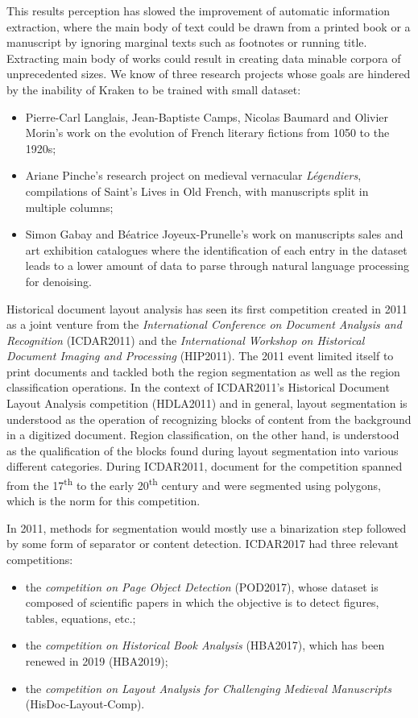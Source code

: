\documentclass{jdmdh}
\begin{document}
This results perception has slowed the improvement of automatic information extraction, where the main body of text could be drawn from a printed book or a manuscript by ignoring marginal texts such as footnotes or running title. Extracting main body of works could result in creating data minable corpora of unprecedented sizes. We know of three research projects whose goals are hindered by the inability of Kraken to be trained with small dataset:

\begin{itemize}
    \item Pierre-Carl Langlais, Jean-Baptiste Camps, Nicolas Baumard and Olivier Morin's work on the evolution of French literary fictions from 1050 to the 1920s;
    \item Ariane Pinche's research project on medieval vernacular \textit{Légendiers}, compilations of Saint's Lives in Old French, with manuscripts split in multiple columns;
    \item Simon Gabay and Béatrice Joyeux-Prunelle's work on manuscripts sales and art exhibition catalogues where the identification of each entry in the dataset leads to a lower amount of data to parse through natural language processing for denoising.
\end{itemize}

Historical document layout analysis has seen its first competition created in 2011 as a joint venture from the \textit{International Conference on Document Analysis and Recognition} (ICDAR2011) and the \textit{International Workshop on Historical Document Imaging and Processing} (HIP2011). The 2011 event limited itself to print documents and tackled both the region segmentation as well as the region classification operations. In the context of ICDAR2011's Historical Document Layout Analysis competition (HDLA2011) and in general, layout segmentation is understood as the operation of recognizing blocks of content from the background in a digitized document. Region classification, on the other hand, is understood as the qualification of the blocks found during layout segmentation into various different categories. During ICDAR2011, document for the competition spanned from the 17\textsuperscript{th} to the early 20\textsuperscript{th} century and were segmented using polygons, which is the norm for this competition.

In 2011, methods for segmentation would mostly use a binarization step followed by some form of separator or content detection. 
ICDAR2017 had three relevant competitions:
\begin{itemize}
    \item the \textit{competition on Page Object Detection} (POD2017), whose dataset is composed of scientific papers in which the objective is to detect figures, tables, equations, etc.;
    \item the \textit{competition on Historical Book Analysis} (HBA2017), which has been renewed in 2019 (HBA2019);
    \item the \textit{competition on Layout Analysis for Challenging Medieval Manuscripts} (HisDoc-Layout-Comp).
\end{itemize}
\end{document}
